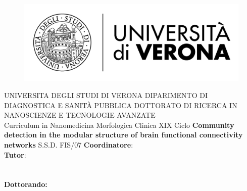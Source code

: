 
\begin{titlepage}
    \begin{figure}[!h]
    \flushleft
	\includegraphics[width=0.25\columnwidth]{images/univr.png}
	\end{figure}

    \begin{center}
    	\large
        UNIVERSITA DEGLI STUDI DI VERONA
        \hfill
        \vfill
		DIPARIMENTO DI DIAGNOSTICA E SANIT\`A PUBBLICA
		\vfill
		DOTTORATO DI RICERCA IN NANOSCIENZE E TECNOLOGIE AVANZATE\\Curriculum in Nanomedicina Morfologica Clinica
		\vfill
		XIX Ciclo
		\vfill
        \begingroup
       		\huge\textbf{
            Community detection in the modular structure of brain functional connectivity networks
            }
            \bigskip
        \endgroup
        \vfill
        S.S.D. FIS/07
		\flushleft 
		\normalsize{\textbf{Coordinatore}:}\\
		\flushleft
		\normalsize{\textbf{Tutor}:}\\
		\\
		\\
        \vfill  
        \flushright
        \normalsize{\textbf{Dottorando:}}\\
        \\	
		\vfill

    \end{center}  
\end{titlepage}

